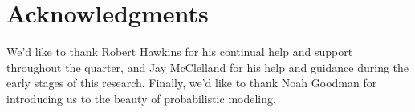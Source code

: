 \documentclass[10pt,letterpaper]{article}
\begin{document}
	
	\section{Acknowledgments}
	
	We'd like to thank Robert Hawkins for his continual help and support throughout the quarter, and Jay McClelland for his help and guidance during the early stages of this research. Finally, we'd like to thank Noah Goodman for introducing us to the beauty of probabilistic modeling.
	
	
	
	
	
	
	\setlength{\bibleftmargin}{.125in}
	\setlength{\bibindent}{-\bibleftmargin}
	
	
	
	
\end{document}
